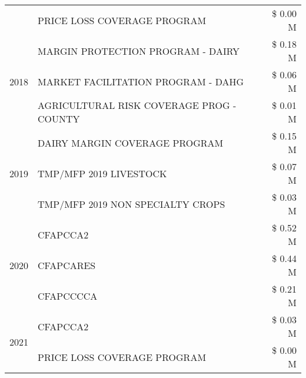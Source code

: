 \begin{tabular}{llr}
 & PRICE LOSS COVERAGE PROGRAM & \$ 0.00 M \\
\cline{1-3}
\multirow[t]{3}{*}{2018} & MARGIN PROTECTION PROGRAM - DAIRY & \$ 0.18 M \\
 & MARKET FACILITATION PROGRAM - DAHG & \$ 0.06 M \\
 & AGRICULTURAL RISK COVERAGE PROG - COUNTY & \$ 0.01 M \\
\cline{1-3}
\multirow[t]{3}{*}{2019} & DAIRY MARGIN COVERAGE PROGRAM & \$ 0.15 M \\
 & TMP/MFP 2019 LIVESTOCK & \$ 0.07 M \\
 & TMP/MFP 2019 NON SPECIALTY CROPS & \$ 0.03 M \\
\cline{1-3}
\multirow[t]{3}{*}{2020} & CFAPCCA2 & \$ 0.52 M \\
 & CFAPCARES & \$ 0.44 M \\
 & CFAPCCCCA & \$ 0.21 M \\
\cline{1-3}
\multirow[t]{2}{*}{2021} & CFAPCCA2 & \$ 0.03 M \\
 & PRICE LOSS COVERAGE PROGRAM & \$ 0.00 M \\
\cline{1-3}
\bottomrule
\end{tabular}
